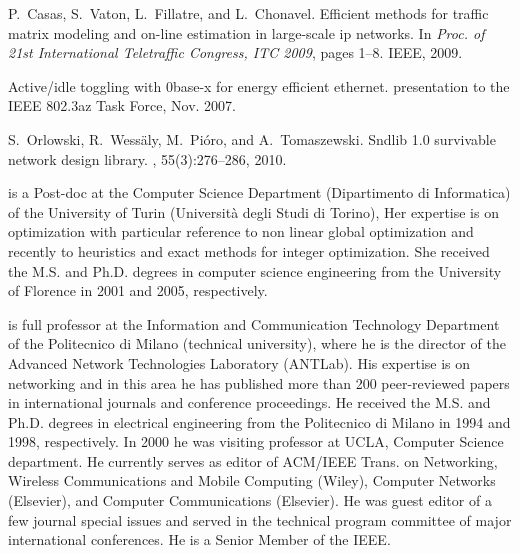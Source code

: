 \documentclass[final,5p,times,twocolumn]{elsarticle}
\begin{document}
\begin{thebibliography}{10}
P.~Casas, S.~Vaton, L.~Fillatre, and L.~Chonavel.
\newblock Efficient methods for traffic matrix modeling and on-line estimation
  in large-scale ip networks.
\newblock In {\em Proc. of 21st International Teletraffic Congress, ITC 2009},
  pages 1--8. IEEE, 2009.

Active/idle toggling with 0base-x for energy efficient ethernet.
\newblock presentation to the IEEE 802.3az Task Force, Nov. 2007.

S.~Orlowski, R.~Wess\"{a}ly, M.~Pi{\'o}ro, and A.~Tomaszewski.
\newblock Sndlib 1.0 survivable network design library.
, 55(3):276--286, 2010.

\end{thebibliography}




\clearpage{} is a Post-doc at the Computer Science Department (Dipartimento di Informatica) of the University of Turin (Universit\`a degli Studi di Torino), Her expertise is on optimization with particular reference to non linear global optimization and recently to heuristics and exact methods for integer optimization. She received the M.S. and Ph.D. degrees in computer science engineering from the University of Florence in 2001 and 2005, respectively.


 is full professor at the Information and Communication Technology Department of the Politecnico di Milano (technical university), where he is the director of the Advanced Network Technologies Laboratory (ANTLab). His expertise is on networking and in this area he has published more than 200 peer-reviewed papers in international journals and conference proceedings.
He received the M.S. and Ph.D. degrees in electrical engineering from the Politecnico di Milano in 1994 and 1998, respectively. In 2000 he was visiting professor at UCLA, Computer Science department. He currently serves as editor of ACM/IEEE Trans. on Networking, Wireless Communications and Mobile Computing (Wiley), Computer Networks (Elsevier), and Computer Communications (Elsevier). He was guest editor of a few journal special issues  and served in the technical program committee of major international conferences. He is a Senior Member of the IEEE.
\end{document}

